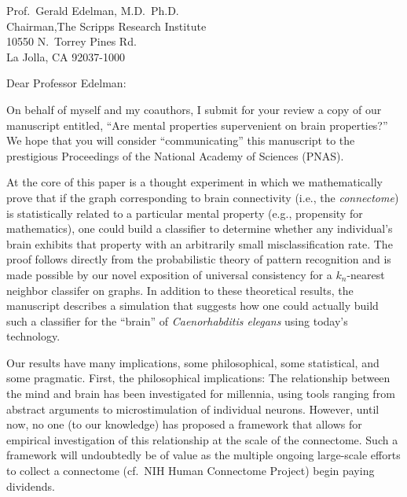 \documentclass[10pt]{letter}
\date{\today}
\begin{document}
\begin{letter}{	Prof.\ Gerald Edelman, M.D.\, Ph.D.\ \\
               	Chairman,The Scripps Research Institute \\
				10550 N.\ Torrey Pines Rd.\ \\
               	La Jolla, CA  92037-1000}   
                           
\opening{Dear Professor Edelman:}

On behalf of myself and my coauthors, I submit for your review a copy of our
manuscript entitled, ``Are mental properties supervenient on brain properties?''
We hope that you will consider ``communicating'' this manuscript to the
prestigious Proceedings of the National Academy of Sciences (PNAS).  

At the core of this paper is a thought experiment in which we mathematically
prove that if the graph corresponding to brain connectivity (i.e., the
\emph{connectome}) is statistically related to a particular mental property
(e.g., propensity for mathematics), one could build a classifier to determine
whether any individual's brain exhibits that property with an arbitrarily small
misclassification rate.  The proof follows directly from the probabilistic
theory of pattern recognition and is made possible by our novel exposition of
universal consistency for a $k_n$-nearest neighbor classifer on graphs.  In
addition to these theoretical results, the manuscript describes a simulation
that suggests how one could actually build such a classifier for the ``brain''
of \emph{Caenorhabditis elegans} using today's technology.

Our results have many implications, some philosophical, some statistical, and
some pragmatic.  First, the philosophical implications:  The relationship
between the mind and brain has been investigated for millennia, using tools
ranging from abstract arguments to microstimulation of individual neurons.
However, until now, no one (to our knowledge) has proposed a framework that
allows for empirical investigation of this relationship at the scale of the
connectome.  Such a framework will undoubtedly be of value as the multiple
ongoing large-scale efforts to collect a connectome (cf.\ NIH Human Connectome
Project) begin paying dividends. 



\end{letter}
\end{document}

